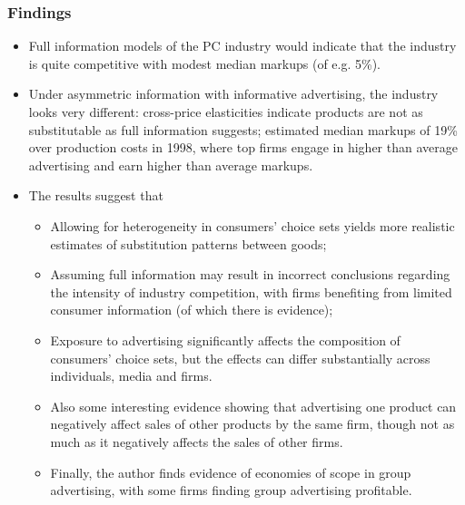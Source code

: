 \documentclass[11pt]{article}
\numberwithin{equation}{section}
\begin{document}
			\subsubsection*{Findings}
		\begin{itemize}
			\item Full information models of the PC industry would indicate that the industry is quite competitive with modest median markups (of e.g. 5\%).
			\item Under asymmetric information with informative advertising, the industry looks very different: cross-price elasticities indicate products are not as substitutable as full information suggests; estimated median markups of 19\% over production costs in 1998, where top firms engage in higher than average advertising and earn higher than average markups.
			\item The results suggest that
			\begin{itemize}
				\item Allowing for heterogeneity in consumers' choice sets yields more realistic estimates of substitution patterns between goods;
				\item Assuming full information may result in incorrect conclusions regarding the intensity of industry competition, with firms benefiting from limited consumer information (of which there is evidence);
				\item Exposure to advertising significantly affects the composition of consumers' choice sets, but the effects can differ substantially across individuals, media and firms.
				\item Also some interesting evidence showing that advertising one product can negatively affect sales of other products by the same firm, though not as much as it negatively affects the sales of other firms.
				\item Finally, the author finds evidence of economies of scope in group advertising, with some firms finding group advertising profitable.
			\end{itemize}
		\end{itemize}
\end{document}
